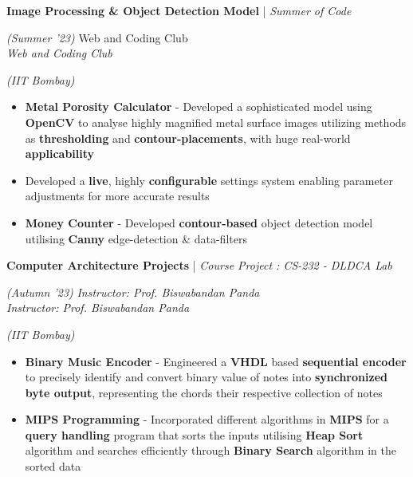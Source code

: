 \documentclass[10pt]{article}
\renewcommand{\subsection}[4]{
	\def\temp{#4}
	\vspace{2pt}
	{
		\large
		{\textbf{#1}} | {\sl #2} \filldate{#3}
		\ifx\temp\empty
		\else
		{
			\\[0.1em]
			\fontsize{11}{13.2}\selectfont
			\sl #4
		}
		\fi
	}
}
\newcommand{\filldate}[1]{\strut\hfill {\small \textit{(#1)}}}
\begin{document}
\subsection{Image Processing \& Object Detection Model}{Summer of Code}{Summer '23}{Web and Coding Club}\filldate{IIT Bombay}
\begin{itemize}
	\item \textbf{Metal Porosity Calculator} - Developed a sophisticated model using \textbf{OpenCV} to analyse highly magnified metal surface images utilizing methods as \textbf{thresholding}  and \textbf{contour-placements}, with huge real-world \textbf{applicability}
        \item Developed a \textbf{live}, highly\textbf{ configurable} settings system enabling parameter adjustments for more accurate results
	\item \textbf{Money Counter} - Developed \textbf{contour-based} object detection model utilising \textbf{Canny} edge-detection \& data-filters
 
\end{itemize}

\subsection{Computer Architecture Projects}{Course Project : CS-232 - DLDCA Lab}{Autumn '23}{\textit{Instructor: Prof. Biswabandan Panda}}\filldate{IIT Bombay}
\begin{itemize}
	\item \textbf{Binary Music Encoder} - Engineered a \textbf{VHDL }based\textbf{ sequential encoder} to precisely identify and convert binary value of notes into \textbf{synchronized byte output}, representing the chords their respective collection of notes
 	\item \textbf{MIPS Programming} - Incorporated different algorithms in \textbf{MIPS} for a \textbf{query handling} program that sorts the inputs utilising \textbf{Heap Sort} algorithm and searches efficiently through \textbf{Binary Search} algorithm in the sorted data 
  
\end{itemize}
\end{document}
